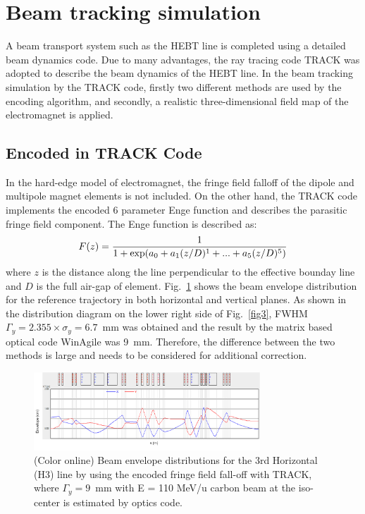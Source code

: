 \documentclass[jkps,preprint,fleqn,showpacs,showkeys,10pt,twocolumn]{revtex4}
\begin{document}
\section{Beam tracking simulation}
\label{sec:TRACK}
A beam transport system such as the HEBT line is completed using a detailed beam dynamics code.
Due to many advantages, the ray tracing code TRACK\cite{TRACK} was adopted to describe the beam dynamics of the HEBT line.
In the beam tracking simulation by the TRACK code, firstly two different methods are used by the encoding algorithm,
and secondly, a realistic three-dimensional field map of the electromagnet is applied.

\subsection{Encoded in TRACK Code}
In the hard-edge model of electromagnet, the fringe field falloff of the dipole and multipole magnet elements is not included.
On the other hand, the TRACK code implements the encoded 6 parameter Enge function\cite{Enge} and describes the parasitic fringe field component.  
The Enge function is described as\cite{EngeTrack}:
\[
F(z) = \frac{1}{1+{\rm exp}(a_{0}+a_{1}(z/D)^{1}+...+a_{5}(z/D)^{5})} 
\]
where $z$ is the distance along the line perpendicular to the effective bounday line and $D$ is the full air-gap of element.
Fig.~\ref{fig2} shows the beam envelope distribution for the reference trajectory in both horizontal and vertical planes.
As shown in the distribution diagram on the lower right side of Fig.~\ref{fig3}, FWHM $\Gamma_{y} = 2.355 \times \sigma_{y} = 6.7$~mm was obtained
and the result by the matrix based optical code WinAgile was 9~mm.
Therefore, the difference between the two methods is large and needs to be considered for additional correction.
\begin{figure}[h]
  \begin{center}
    \includegraphics[width=8.5cm]{Fig03.png}      
    \caption{(Color online) Beam envelope distributions for the 3rd Horizontal (H3) line by using the encoded fringe field fall-off with TRACK, 
      where $\Gamma_{y} = 9$~mm with E = 110 MeV/u carbon beam at the iso-center is estimated by optics code.}
    \label{fig2}
  \end{center}
\end{figure}
\end{document}
